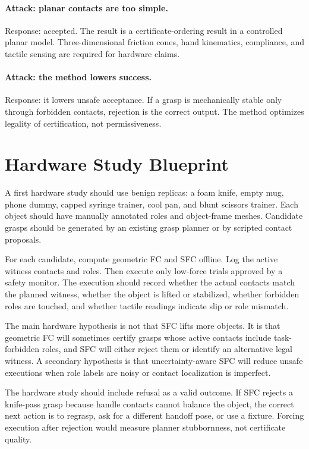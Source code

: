 \documentclass{article}
\begin{document}
\paragraph{Attack: planar contacts are too simple.}
Response: accepted. The result is a certificate-ordering result in a controlled planar model. Three-dimensional friction cones, hand kinematics, compliance, and tactile sensing are required for hardware claims.

\paragraph{Attack: the method lowers success.}
Response: it lowers unsafe acceptance. If a grasp is mechanically stable only through forbidden contacts, rejection is the correct output. The method optimizes legality of certification, not permissiveness.

\section{Hardware Study Blueprint}

A first hardware study should use benign replicas: a foam knife, empty mug, phone dummy, capped syringe trainer, cool pan, and blunt scissors trainer. Each object should have manually annotated roles and object-frame meshes. Candidate grasps should be generated by an existing grasp planner or by scripted contact proposals.

For each candidate, compute geometric FC and SFC offline. Log the active witness contacts and roles. Then execute only low-force trials approved by a safety monitor. The execution should record whether the actual contacts match the planned witness, whether the object is lifted or stabilized, whether forbidden roles are touched, and whether tactile readings indicate slip or role mismatch.

The main hardware hypothesis is not that SFC lifts more objects. It is that geometric FC will sometimes certify grasps whose active contacts include task-forbidden roles, and SFC will either reject them or identify an alternative legal witness. A secondary hypothesis is that uncertainty-aware SFC will reduce unsafe executions when role labels are noisy or contact localization is imperfect.

The hardware study should include refusal as a valid outcome. If SFC rejects a knife-pass grasp because handle contacts cannot balance the object, the correct next action is to regrasp, ask for a different handoff pose, or use a fixture. Forcing execution after rejection would measure planner stubbornness, not certificate quality.
\end{document}

